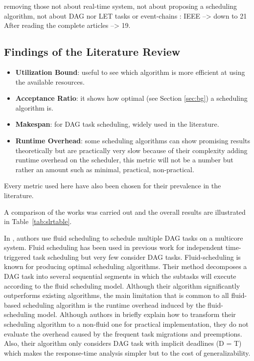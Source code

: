             removing those not about real-time system,
            not about proposing a scheduling algorithm,
            not about DAG nor LET tasks or event-chains : IEEE --> down to 21
            After reading the complete articles --> 19.

\paragraph{}

\subsection{Findings of the Literature Review}

\begin{itemize}
    \item \textbf{Utilization Bound}: useful to see which algorithm is more efficient at using the available resources.
    \item \textbf{Acceptance Ratio}: it shows how optimal (see Section \ref{sec:bg}) a scheduling algorithm is.
    \item \textbf{Makespan}: for DAG task scheduling, widely used in the literature.
    \item \textbf{Runtime Overhead}: some scheduling algorithms can show promising results theoretically but are practically very slow because 
    of their complexity adding runtime overhead on the scheduler, this metric will not be a number but rather an amount such as minimal, practical, non-practical.
\end{itemize}
Every metric used here have also been chosen for their prevalence in the literature.

A comparison of the works was carried out and the overall results are illustrated in Table~\ref{tab:slrtable}.
 
In \cite{guan2021DAGfluid}, authors 
use fluid scheduling to schedule multiple DAG tasks
on a multicore system. 
Fluid scheduling has been used in previous work for independent
time-triggered task scheduling\cite{baruah1993PFair}\cite{cho2006LLREF} 
but very few consider DAG tasks. Fluid-scheduling is known for producing optimal scheduling algorithms.
Their method decomposes a DAG task into several sequential segments
in which the subtasks will execute according to the fluid scheduling 
model. Although their algorithm significantly outperforms
existing algorithms, the main limitation that is common to all fluid-based
scheduling algorithm is the runtime overhead induced by the fluid-scheduling model.
Although authors in \cite{guan2021DAGfluid} briefly explain how 
to transform their scheduling algorithm to a non-fluid one for practical implementation,
they do not evaluate the overhead caused by the frequent task migrations
and preemptions. Also, their algorithm only considers DAG task with implicit deadlines
(D = T) which makes the response-time analysis simpler but to the cost
of generalizability.


